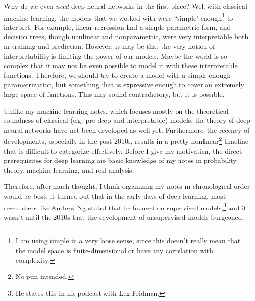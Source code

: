 Why do we even \textit{need} deep neural networks in the first place? Well with classical machine learning, the models that we worked with were ``simple' enough\footnote{I am using simple in a very loose sense, since this doesn't really mean that the model space is finite-dimensional or have any correlation with complexity.} to interpret. For example, linear regression had a simple parametric form, and decision trees, though nonlinear and nonparametric, were very interpretable both in training and prediction. However, it may be that the very notion of interpretability is limiting the power of our models. Maybe the world is so complex that it may not be even possible to model it with these interpretable functions. Therefore, we should try to create a model with a simple enough parametrization, but something that is expressive enough to cover an extremely large space of functions. This may sound contradictory, but it is possible. 

Unlike my machine learning notes, which focuses mostly on the theoretical soundness of classical (e.g. pre-deep and interpretable) models, the theory of deep neural networks have not been developed as well yet. Furthermore, the recency of developments, especially in the post-2010s, results in a pretty nonlinear\footnote{No pun intended.} timeline that is difficult to categorize effectively. Before I give my motivation, the direct prerequisites for deep learning are basic knowledge of my notes in probability theory, machine learning, and real analysis. 

Therefore, after much thought, I think organizing my notes in chronological order would be best. It turned out that in the early days of deep learning, most researchers like Andrew Ng stated that he focused on supervised models,\footnote{He states this in his podcast with Lex Fridman.} and it wasn't until the 2010s that the development of unsupervised models burgeoned. 

